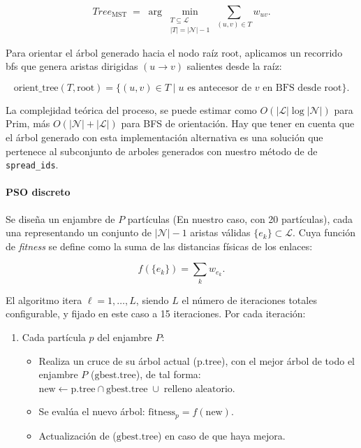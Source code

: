 \begin{equation}
Tree_{\mathrm{MST}} \;=\;\arg\min_{\substack{T\subseteq \mathcal{L}\\|T|=|\mathcal{N}|-1}} 
\sum_{(u,v)\in T} w_{uv}.
\end{equation}

Para orientar el árbol generado hacia el nodo raíz \(\mathrm{root}\), aplicamos un recorrido \gls{bfs} que genera aristas dirigidas \((u\!\to\!v)\) salientes desde la raíz:

\begin{equation}
\mathrm{orient\_tree}(T,\mathrm{root}) = \{(u,v)\in T \mid u \text{ es antecesor de } v \text{ en BFS desde root}\}.
\end{equation}

La complejidad teórica del proceso, se puede estimar como \(O(|\mathcal{L}|\log|\mathcal{N}|)\) para Prim, más \(O(|\mathcal{N}|+|\mathcal{L}|)\) para BFS de orientación. Hay que tener en cuenta que el árbol generado con esta implementación alternativa es una solución que pertenece al subconjunto de arboles generados con nuestro método de de \texttt{spread\_ids}.



\paragraph{PSO discreto} Se diseña un enjambre de \(P\) partículas (En nuestro caso, con 20 partículas), cada una representando un conjunto  de \(|\mathcal{N}|-1\) aristas válidas \(\{e_k\}\subset \mathcal{L}\). Cuya función de \emph{fitness} se define como la suma de las distancias físicas de los enlaces:

\begin{equation}
f(\{e_k\}) = \sum_k w_{e_k}.
\end{equation}

El algoritmo itera \(\ell=1,\dots,L\), siendo $L$ el número de iteraciones totales configurable, y fijado en este caso a 15 iteraciones. Por cada iteración:

\begin{enumerate}
  \item Cada partícula \(p\) del enjambre \(P\):  
    \begin{itemize}
      \item Realiza un cruce de su árbol actual ($\mathrm{p.tree}$), con el mejor árbol de todo el enjambre \(P\) ($\mathrm{gbest.tree}$), de tal forma:  
      \(\mathrm{new} \leftarrow \mathrm{p.tree}\cap \mathrm{gbest.tree}\;\cup\;\text{relleno aleatorio}\).
      \item Se evalúa el nuevo árbol: \(\mathrm{fitness}_p = f(\mathrm{new})\).
      \item Actualización de ($\mathrm{gbest.tree}$) en caso de que haya mejora.
    \end{itemize}
\end{enumerate}

